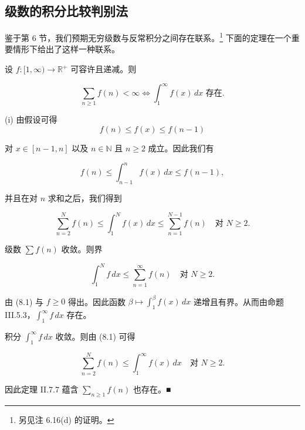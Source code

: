 \subsection*{级数的积分比较判别法}

鉴于第 6 节，我们预期无穷级数与反常积分之间存在联系。\footnote{另见注 6.16(d) 的证明。} 下面的定理在一个重要情形下给出了这样一种联系。

\begin{proposition}

设 $ f : [1, \infty) \to \mathbb{R}^{+} $ 可容许且递减。则

\[
\sum_{n \ge 1} f(n) < \infty \Longleftrightarrow \int_{1}^{\infty} f(x)\,dx \text{ 存在} .
\]

\proofhead
(i) 由假设可得
\[
f(n) \le f(x) \le f(n - 1)
\]

对 $ x \in [n - 1, n] $ 以及 $ n \in \mathbb{N} $ 且 $ n \ge 2 $ 成立。因此我们有

\[
f(n) \le \int_{n-1}^{n} f(x)\,dx \le f(n - 1) ,
\]

并且在对 $ n $ 求和之后，我们得到

\begin{equation}
\sum_{n=2}^{N} f(n) \le \int_{1}^{N} f(x)\,dx \le \sum_{n=1}^{N-1} f(n) \quad \text{对 } N \ge 2 .\tag{8.1}
\end{equation}

\begin{subitems}
\item[（ii）]

级数 $ \sum f(n) $ 收敛。则界

\[
\int_{1}^{N} f\,dx \le \sum_{n=1}^{\infty} f(n) \quad \text{对 } N \ge 2 .
\]

由 (8.1) 与 $ f \ge 0 $ 得出。因此函数 $ \beta \mapsto \int_{1}^{\beta} f(x)\,dx $ 递增且有界。从而由命题 III.5.3，$ \int_{1}^{\infty} f\,dx $ 存在。

\item[（iii）]

积分 $ \int_{1}^{\infty} f\,dx $ 收敛。则由 (8.1) 可得

\[
\sum_{n=2}^{N} f(n) \le \int_{1}^{\infty} f(x)\,dx \quad \text{对 } N \ge 2 .
\]

因此定理 II.7.7 蕴含 $ \sum_{n \ge 1} f(n) $ 也存在。\nobreak\hspace{0.35em}■

\end{subitems}

\end{proposition}

